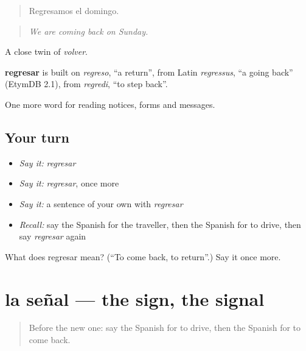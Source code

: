 \begin{quote}
Regresamos el domingo.
\end{quote}

\begin{quote}
\emph{We are coming back on Sunday.}
\end{quote}

A close twin of \emph{volver}.

\begin{cousinweb}
\textbf{regresar} is built on \emph{regreso}, \textquotedblleft{}a return\textquotedblright{}, from Latin \emph{regressus}, \textquotedblleft{}a going back\textquotedblright{} (EtymDB 2.1), from \emph{regredi}, \textquotedblleft{}to step back\textquotedblright{}.
\end{cousinweb}

\begin{grammarlens}[title={What you've built}]
One more word for reading notices, forms and messages.
\end{grammarlens}

\subsection*{Your turn}
\begin{itemize}
\raggedright
  \item \emph{Say it:} \emph{regresar}
  \item \emph{Say it:} \emph{regresar}, once more
  \item \emph{Say it:} a sentence of your own with \emph{regresar}
  \item \emph{Recall:} say the Spanish for the traveller, then the Spanish for to drive, then say \emph{regresar} again
\end{itemize}

\begin{tcolorbox}[breakable,colback=teal!4,colframe=teal!35!black,title={Before you move on}]
What does regresar mean? (\textquotedblleft{}To come back, to return\textquotedblright{}.) Say it once more.
\end{tcolorbox}
\section[la señal]{la señal — the sign, the signal}

\label{lesson:ES-C501-senal}



\begin{quote}
Before the new one: say the Spanish for to drive, then the Spanish for to come back.
\end{quote}

